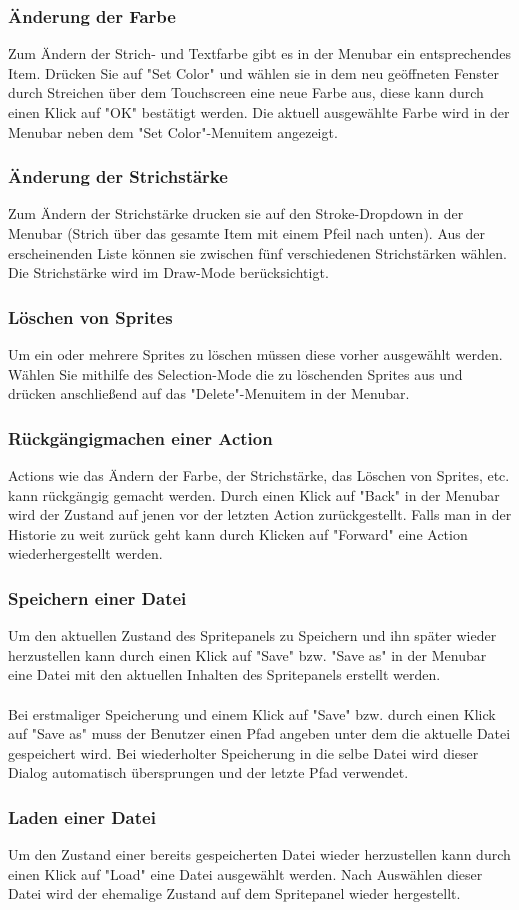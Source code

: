 \subsubsection{Änderung der Farbe}

Zum Ändern der Strich- und Textfarbe gibt es in der Menubar ein entsprechendes Item. Drücken Sie auf "Set Color" und wählen sie in dem neu geöffneten Fenster durch Streichen über dem Touchscreen eine neue Farbe aus, diese kann durch einen  Klick auf "OK" bestätigt werden. Die aktuell ausgewählte Farbe wird in der Menubar neben dem "Set Color"-Menuitem angezeigt.

\subsubsection{Änderung der Strichstärke}

Zum Ändern der Strichstärke drucken sie auf den Stroke-Dropdown in der Menubar (Strich über das gesamte Item mit einem Pfeil nach unten). Aus der erscheinenden Liste können sie zwischen fünf verschiedenen Strichstärken wählen. Die Strichstärke wird im Draw-Mode berücksichtigt.

\subsubsection{Löschen von Sprites}

Um ein oder mehrere Sprites zu löschen müssen diese vorher ausgewählt werden. Wählen Sie mithilfe des Selection-Mode die zu löschenden Sprites aus und drücken anschließend auf das "Delete"-Menuitem in der Menubar.

\subsubsection{Rückgängigmachen einer Action}

Actions wie das Ändern der Farbe, der Strichstärke, das Löschen von Sprites, etc. kann rückgängig gemacht werden. Durch einen Klick auf "Back" in der Menubar wird der Zustand auf jenen vor der letzten Action zurückgestellt. Falls man in der Historie zu weit zurück geht kann durch Klicken auf "Forward" eine Action wiederhergestellt werden.

\subsubsection{Speichern einer Datei}

Um den aktuellen Zustand des Spritepanels zu Speichern und ihn später wieder herzustellen kann durch einen Klick auf "Save" bzw. "Save as" in der Menubar eine Datei mit den aktuellen Inhalten des Spritepanels erstellt werden.\\
\\
Bei erstmaliger Speicherung und einem Klick auf "Save" bzw. durch einen Klick auf "Save as" muss der Benutzer einen Pfad angeben unter dem die aktuelle Datei gespeichert wird. Bei wiederholter Speicherung in die selbe Datei wird dieser Dialog automatisch übersprungen und der letzte Pfad verwendet.

\subsubsection{Laden einer Datei}

Um den Zustand einer bereits gespeicherten Datei wieder herzustellen kann durch einen Klick auf "Load" eine Datei ausgewählt werden. Nach Auswählen dieser Datei wird der ehemalige Zustand auf dem Spritepanel wieder hergestellt.